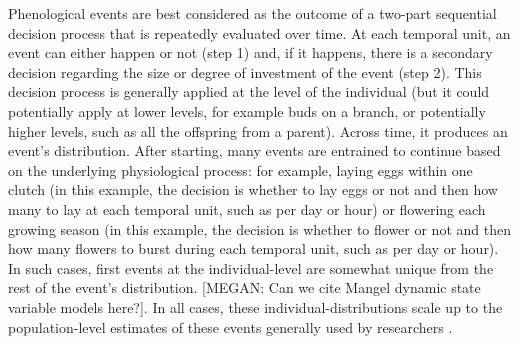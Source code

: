 \documentclass[11pt,letterpaper]{article}
\begin{document}
Phenological events are best considered as the outcome of a two-part sequential decision process that is repeatedly evaluated over time. At each temporal unit, an event can either happen or not (step 1) and, if it happens, there is a secondary decision regarding the size or degree of investment of the event (step 2). This decision process is generally applied at the level of the individual (but it could potentially apply at lower levels, for example buds on a branch, or potentially higher levels, such as all the offspring from a parent). Across time, it produces an event's distribution. After starting, many events are entrained to continue based on the underlying physiological process: for example, laying eggs within one clutch (in this example, the decision is whether to lay eggs or not and then how many to lay at each temporal unit, such as per day or hour) or flowering each growing season (in this example, the decision is whether to flower or not and then how many flowers to burst during each temporal unit, such as per day or hour). In such cases, first events at the individual-level are somewhat unique from the rest of the event's distribution. [MEGAN: Can we cite Mangel dynamic state variable models here?]. In all cases, these individual-distributions scale up to the population-level estimates of these events generally used by researchers \citep[see][for an excellent discussion of the outcomes of this scaling]{inouye2019}.
\end{document}
